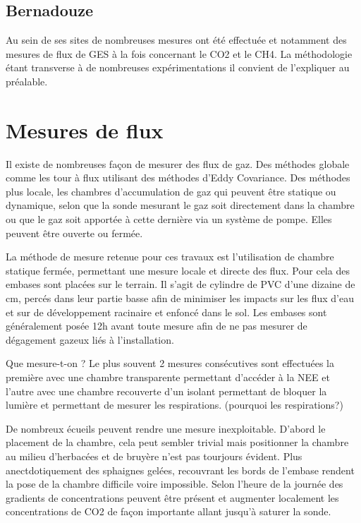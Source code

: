 \subsection{Bernadouze}


Au sein de ses sites de nombreuses mesures ont été effectuée et notamment des mesures de flux de GES à la fois concernant le CO2 et le CH4. La méthodologie étant transverse à de nombreuses expérimentations il convient de l'expliquer au préalable.

\section{Mesures de flux}

Il existe de nombreuses façon de mesurer des flux de gaz. 
Des méthodes globale comme les tour à flux utilisant des méthodes d'Eddy Covariance. 
Des méthodes plus locale, les chambres d'accumulation de gaz qui peuvent être statique ou dynamique, selon que la sonde mesurant le gaz soit directement dans la chambre ou que le gaz soit apportée à cette dernière via un système de pompe. Elles peuvent être ouverte ou fermée.

La méthode de mesure retenue pour ces travaux est l'utilisation de chambre statique fermée, permettant une mesure locale et directe des flux.
Pour cela des embases sont placées sur le terrain. Il s'agit de cylindre de PVC d'une dizaine de cm, percés dans leur partie basse afin de minimiser les impacts sur les flux d'eau et sur de développement racinaire et enfoncé dans le sol.
Les embases sont généralement posée 12h avant toute mesure afin de ne pas mesurer de dégagement gazeux liés à l'installation.

Que mesure-t-on ?
Le plus souvent 2 mesures consécutives sont effectuées la première avec une chambre transparente permettant d'accéder à la NEE et l'autre avec une chambre recouverte d'un isolant permettant de bloquer la lumière et permettant de mesurer les respirations. (pourquoi les respirations?)

De nombreux écueils peuvent rendre une mesure inexploitable. D'abord le placement de la chambre, cela peut sembler trivial mais positionner la chambre au milieu d'herbacées et de bruyère n'est pas tourjours évident. Plus anectdotiquement des sphaignes gelées, recouvrant les bords de l'embase rendent la pose de la chambre difficile voire impossible. Selon l'heure de la journée des gradients de concentrations peuvent être présent et augmenter localement les concentrations de CO2 de façon importante allant jusqu'à saturer la sonde.

